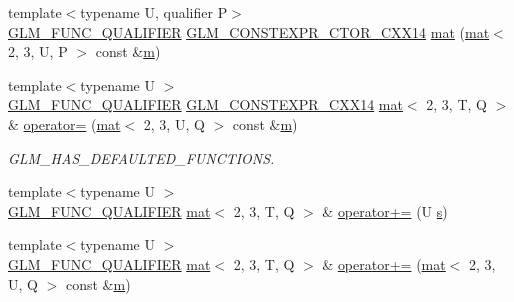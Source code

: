 \begin{DoxyCompactItemize}
\item 
{\footnotesize template$<$typename U, qualifier P$>$ }\\\hyperlink{setup_8hpp_a33fdea6f91c5f834105f7415e2a64407}{G\+L\+M\+\_\+\+F\+U\+N\+C\+\_\+\+Q\+U\+A\+L\+I\+F\+I\+ER} \hyperlink{setup_8hpp_a0900f9145e68bf6061b6f5e7be3fa751}{G\+L\+M\+\_\+\+C\+O\+N\+S\+T\+E\+X\+P\+R\+\_\+\+C\+T\+O\+R\+\_\+\+C\+X\+X14} \hyperlink{structglm_1_1mat_3_012_00_013_00_01_t_00_01_q_01_4_a6cbdbc4b3a71c347e4d695c9db686054}{mat} (\hyperlink{structglm_1_1mat}{mat}$<$ 2, 3, U, P $>$ const \&\hyperlink{_s_d_l__opengl__glext_8h_af593500c283bf1a787a6f947f503a5c2}{m})
\item 
{\footnotesize template$<$typename U $>$ }\\\hyperlink{setup_8hpp_a33fdea6f91c5f834105f7415e2a64407}{G\+L\+M\+\_\+\+F\+U\+N\+C\+\_\+\+Q\+U\+A\+L\+I\+F\+I\+ER} \hyperlink{setup_8hpp_a4dd12abf5e1164bc57f3a34671d03844}{G\+L\+M\+\_\+\+C\+O\+N\+S\+T\+E\+X\+P\+R\+\_\+\+C\+X\+X14} \hyperlink{structglm_1_1mat}{mat}$<$ 2, 3, T, Q $>$ \& \hyperlink{structglm_1_1mat_3_012_00_013_00_01_t_00_01_q_01_4_a6b5fd23ac7f9803d6b3a71d10b209bb4}{operator=} (\hyperlink{structglm_1_1mat}{mat}$<$ 2, 3, U, Q $>$ const \&\hyperlink{_s_d_l__opengl__glext_8h_af593500c283bf1a787a6f947f503a5c2}{m})
\begin{DoxyCompactList}\small\item\em G\+L\+M\+\_\+\+H\+A\+S\+\_\+\+D\+E\+F\+A\+U\+L\+T\+E\+D\+\_\+\+F\+U\+N\+C\+T\+I\+O\+NS. \end{DoxyCompactList}\item 
{\footnotesize template$<$typename U $>$ }\\\hyperlink{setup_8hpp_a33fdea6f91c5f834105f7415e2a64407}{G\+L\+M\+\_\+\+F\+U\+N\+C\+\_\+\+Q\+U\+A\+L\+I\+F\+I\+ER} \hyperlink{structglm_1_1mat}{mat}$<$ 2, 3, T, Q $>$ \& \hyperlink{structglm_1_1mat_3_012_00_013_00_01_t_00_01_q_01_4_aef7d2e0667c80238e0a1a0144a6d822f}{operator+=} (U \hyperlink{_s_d_l__opengl_8h_a4af680a6c683f88ed67b76f207f2e6e4}{s})
\item 
{\footnotesize template$<$typename U $>$ }\\\hyperlink{setup_8hpp_a33fdea6f91c5f834105f7415e2a64407}{G\+L\+M\+\_\+\+F\+U\+N\+C\+\_\+\+Q\+U\+A\+L\+I\+F\+I\+ER} \hyperlink{structglm_1_1mat}{mat}$<$ 2, 3, T, Q $>$ \& \hyperlink{structglm_1_1mat_3_012_00_013_00_01_t_00_01_q_01_4_a1ff8573bb278d2bc14b3360a652de986}{operator+=} (\hyperlink{structglm_1_1mat}{mat}$<$ 2, 3, U, Q $>$ const \&\hyperlink{_s_d_l__opengl__glext_8h_af593500c283bf1a787a6f947f503a5c2}{m})
\item 

\end{DoxyCompactItemize}
